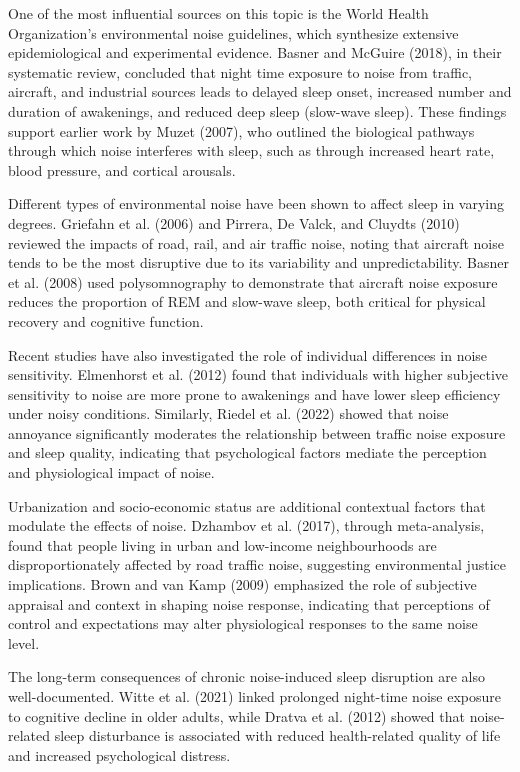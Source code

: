 One of the most influential sources on this topic is the World Health Organization's environmental noise guidelines, which synthesize extensive epidemiological and experimental evidence. Basner and McGuire (2018), in their systematic review, concluded that night time exposure to noise from traffic, aircraft, and industrial sources leads to delayed sleep onset, increased number and duration of awakenings, and reduced deep sleep (slow-wave sleep). These findings support earlier work by Muzet (2007), who outlined the biological pathways through which noise interferes with sleep, such as through increased heart rate, blood pressure, and cortical arousals.

Different types of environmental noise have been shown to affect sleep in varying degrees. Griefahn et al. (2006) and Pirrera, De Valck, and Cluydts (2010) reviewed the impacts of road, rail, and air traffic noise, noting that aircraft noise tends to be the most disruptive due to its variability and unpredictability. Basner et al. (2008) used polysomnography to demonstrate that aircraft noise exposure reduces the proportion of REM and slow-wave sleep, both critical for physical recovery and cognitive function.

Recent studies have also investigated the role of individual differences in noise sensitivity. Elmenhorst et al. (2012) found that individuals with higher subjective sensitivity to noise are more prone to awakenings and have lower sleep efficiency under noisy conditions. Similarly, Riedel et al. (2022) showed that noise annoyance significantly moderates the relationship between traffic noise exposure and sleep quality, indicating that psychological factors mediate the perception and physiological impact of noise.

Urbanization and socio-economic status are additional contextual factors that modulate the effects of noise. Dzhambov et al. (2017), through meta-analysis, found that people living in urban and low-income neighbourhoods are disproportionately affected by road traffic noise, suggesting environmental justice implications. Brown and van Kamp (2009) emphasized the role of subjective appraisal and context in shaping noise response, indicating that perceptions of control and expectations may alter physiological responses to the same noise level.

The long-term consequences of chronic noise-induced sleep disruption are also well-documented. Witte et al. (2021) linked prolonged night-time noise exposure to cognitive decline in older adults, while Dratva et al. (2012) showed that noise-related sleep disturbance is associated with reduced health-related quality of life and increased psychological distress.

